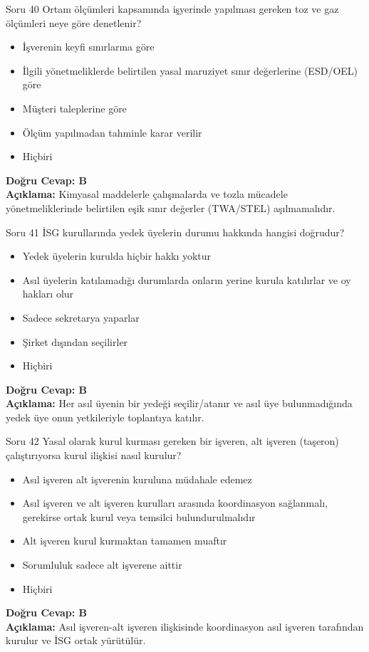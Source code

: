 \documentclass[12pt,a4paper]{article}
\begin{document}
\begin{testcard}{Soru 40}
    Ortam ölçümleri kapsamında işyerinde yapılması gereken toz ve gaz ölçümleri neye göre denetlenir?
    \begin{itemize}
        \item[A)] İşverenin keyfi sınırlarına göre
        \item[B)] İlgili yönetmeliklerde belirtilen yasal maruziyet sınır değerlerine (ESD/OEL) göre
        \item[C)] Müşteri taleplerine göre
        \item[D)] Ölçüm yapılmadan tahminle karar verilir
        \item[E)] Hiçbiri
    \end{itemize}
    \tcblower
    \textbf{Doğru Cevap: B} \\
    \textbf{Açıklama:} Kimyasal maddelerle çalışmalarda ve tozla mücadele yönetmeliklerinde belirtilen eşik sınır değerler (TWA/STEL) aşılmamalıdır.
\end{testcard}

\begin{testcard}{Soru 41}
    İSG kurullarında yedek üyelerin durumu hakkında hangisi doğrudur?
    \begin{itemize}
        \item[A)] Yedek üyelerin kurulda hiçbir hakkı yoktur
        \item[B)] Asıl üyelerin katılamadığı durumlarda onların yerine kurula katılırlar ve oy hakları olur
        \item[C)] Sadece sekretarya yaparlar
        \item[D)] Şirket dışından seçilirler
        \item[E)] Hiçbiri
    \end{itemize}
    \tcblower
    \textbf{Doğru Cevap: B} \\
    \textbf{Açıklama:} Her asıl üyenin bir yedeği seçilir/atanır ve asıl üye bulunmadığında yedek üye onun yetkileriyle toplantıya katılır.
\end{testcard}

\begin{testcard}{Soru 42}
    Yasal olarak kurul kurması gereken bir işveren, alt işveren (taşeron) çalıştırıyorsa kurul ilişkisi nasıl kurulur?
    \begin{itemize}
        \item[A)] Asıl işveren alt işverenin kuruluna müdahale edemez
        \item[B)] Asıl işveren ve alt işveren kurulları arasında koordinasyon sağlanmalı, gerekirse ortak kurul veya temsilci bulundurulmalıdır
        \item[C)] Alt işveren kurul kurmaktan tamamen muaftır
        \item[D)] Sorumluluk sadece alt işverene aittir
        \item[E)] Hiçbiri
    \end{itemize}
    \tcblower
    \textbf{Doğru Cevap: B} \\
    \textbf{Açıklama:} Asıl işveren-alt işveren ilişkisinde koordinasyon asıl işveren tarafından kurulur ve İSG ortak yürütülür.
\end{testcard}
\end{document}

